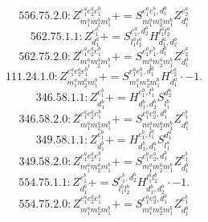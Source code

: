 \documentclass[letterpaper,10pt,fleqn,leqno,onecolumn]{article}
\begin{document}
\begin{equation} \;\;\;\;\;\;  556.75.2.0: Z^{e_{1}^{a}e_{2}^{a}e_{1}^{b}}_{m_{1}^{a}m_{2}^{a}m_{1}^{b}}+=S^{e_{1}^{a}e_{1}^{b},d_{1}^{a}}_{m_{1}^{a}m_{2}^{a}m_{1}^{b}}Z^{e_{2}^{a}}_{d_{1}^{a}} \end{equation}
\begin{equation} \;\;\;\;\;\;  562.75.1.1: Z^{e_{1}^{a}}_{d_{1}^{a}}+=S^{e_{1}^{a},d_{2}^{a}}_{l_{1}^{a}l_{2}^{a}}H^{l_{1}^{a}l_{2}^{a}}_{d_{1}^{a},d_{2}^{a}} \end{equation}
\begin{equation} \;\;\;\;\;\;  562.75.2.0: Z^{e_{1}^{a}e_{2}^{a}e_{1}^{b}}_{m_{1}^{a}m_{2}^{a}m_{1}^{b}}+=S^{e_{1}^{a}e_{1}^{b},d_{1}^{a}}_{m_{1}^{a}m_{2}^{a}m_{1}^{b}}Z^{e_{2}^{a}}_{d_{1}^{a}} \end{equation}
\begin{equation} \;\;\;\;\;\;  111.24.1.0: Z^{e_{1}^{a}e_{2}^{a}e_{1}^{b}}_{m_{1}^{a}m_{2}^{a}m_{1}^{b}}+=S^{e_{1}^{a}e_{1}^{b},d_{1}^{a}}_{m_{1}^{a}m_{2}^{a}m_{1}^{b}}H^{e_{2}^{a}}_{d_{1}^{a}}\cdot -1. \end{equation}
\begin{equation} \;\;\;\;\;\;  346.58.1.1: Z^{e_{1}^{b}}_{d_{1}^{b}}+=H^{e_{1}^{b},l_{1}^{b}}_{d_{1}^{b},d_{2}^{b}}S^{d_{2}^{b}}_{l_{1}^{b}} \end{equation}
\begin{equation} \;\;\;\;\;\;  346.58.2.0: Z^{e_{1}^{a}e_{2}^{a}e_{1}^{b}}_{m_{1}^{a}m_{2}^{a}m_{1}^{b}}+=S^{e_{1}^{a}e_{2}^{a},d_{1}^{b}}_{m_{1}^{a}m_{2}^{a}m_{1}^{b}}Z^{e_{1}^{b}}_{d_{1}^{b}} \end{equation}
\begin{equation} \;\;\;\;\;\;  349.58.1.1: Z^{e_{1}^{b}}_{d_{1}^{b}}+=H^{e_{1}^{b},l_{1}^{a}}_{d_{1}^{b},d_{1}^{a}}S^{d_{1}^{a}}_{l_{1}^{a}} \end{equation}
\begin{equation} \;\;\;\;\;\;  349.58.2.0: Z^{e_{1}^{a}e_{2}^{a}e_{1}^{b}}_{m_{1}^{a}m_{2}^{a}m_{1}^{b}}+=S^{e_{1}^{a}e_{2}^{a},d_{1}^{b}}_{m_{1}^{a}m_{2}^{a}m_{1}^{b}}Z^{e_{1}^{b}}_{d_{1}^{b}} \end{equation}
\begin{equation} \;\;\;\;\;\;  554.75.1.1: Z^{e_{1}^{b}}_{d_{1}^{b}}+=S^{e_{1}^{b},d_{2}^{b}}_{l_{1}^{b}l_{2}^{b}}H^{l_{1}^{b}l_{2}^{b}}_{d_{1}^{b},d_{2}^{b}}\cdot -1. \end{equation}
\begin{equation} \;\;\;\;\;\;  554.75.2.0: Z^{e_{1}^{a}e_{2}^{a}e_{1}^{b}}_{m_{1}^{a}m_{2}^{a}m_{1}^{b}}+=S^{e_{1}^{a}e_{2}^{a},d_{1}^{b}}_{m_{1}^{a}m_{2}^{a}m_{1}^{b}}Z^{e_{1}^{b}}_{d_{1}^{b}} \end{equation}
\end{document}
